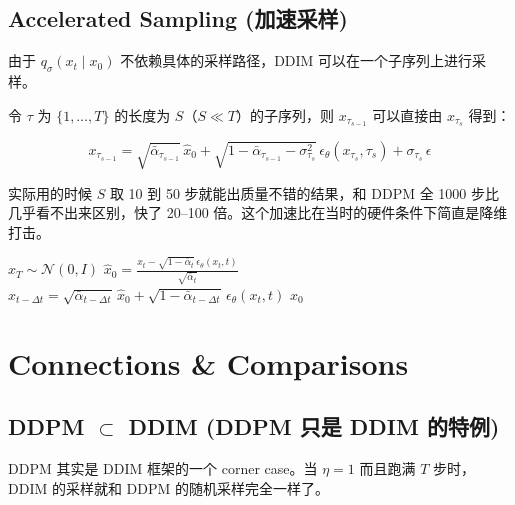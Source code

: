 \documentclass[11pt,a4paper]{article}
\theoremstyle{definition}
\newcommand{\N}{\mathcal{N}}          %
\newcommand{\alphat}{\bar{\alpha}_t}
\begin{document}
\subsection{Accelerated Sampling (加速采样)}

由于 $q_\sigma(x_t \mid x_0)$ 不依赖具体的采样路径，DDIM 可以在一个子序列上进行采样。

令 $\tau$ 为 $\{1, \dots, T\}$ 的长度为 $S$（$S \ll T$）的子序列，则 $x_{\tau_{s-1}}$ 可以直接由 $x_{\tau_s}$ 得到：

\begin{equation}\label{eq:ddim_subseq}
    x_{\tau_{s-1}} = \sqrt{\bar{\alpha}_{\tau_{s-1}}}\, \hat{x}_0
                   + \sqrt{1 - \bar{\alpha}_{\tau_{s-1}} - \sigma_{\tau_s}^2}\, \epsilon_\theta(x_{\tau_s}, \tau_s)
                   + \sigma_{\tau_s}\, \epsilon
\end{equation}

实际用的时候 $S$ 取 10 到 50 步就能出质量不错的结果，和 DDPM 全 1000 步比几乎看不出来区别，快了 20--100 倍。这个加速比在当时的硬件条件下简直是降维打击。

\begin{algorithm}[ht]
\caption{DDIM Sampling (deterministic, $\eta = 0$)}
\label{alg:ddim_sample}
\begin{algorithmic}[1]
\State $x_T \sim \N(0, I)$
 
    \State $\hat{x}_0 = \frac{x_t - \sqrt{1 - \alphat}\, \epsilon_\theta(x_t, t)}{\sqrt{\alphat}}$
    \State $x_{t-\Delta t} = \sqrt{\bar{\alpha}_{t-\Delta t}}\, \hat{x}_0 + \sqrt{1 - \bar{\alpha}_{t-\Delta t}}\, \epsilon_\theta(x_t, t)$
\EndFor
\State \Return $x_0$
\end{algorithmic}
\end{algorithm}


\section{Connections \& Comparisons}

\subsection{DDPM $\subset$ DDIM (DDPM 只是 DDIM 的特例)}

DDPM 其实是 DDIM 框架的一个 corner case。当 $\eta = 1$ 而且跑满 $T$ 步时，DDIM 的采样就和 DDPM 的随机采样完全一样了。
\end{document}
